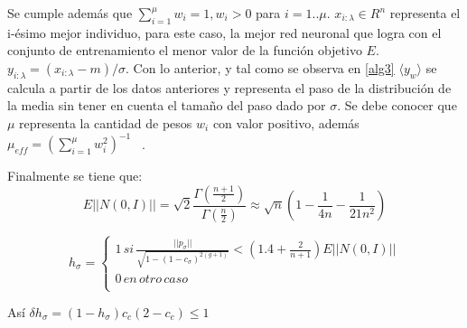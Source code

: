 Se cumple además que $\sum_{i=1}^{\mu}w_{i}=1, w_{i}>0$ para $i=1..\mu$. $x_{i:\lambda}\in R^{n}$ representa el i-ésimo mejor individuo, para este caso, la mejor red neuronal que logra con el conjunto de entrenamiento el menor valor de la función objetivo $E$. $y_{i:\lambda}= (x_{i:\lambda}-m)/\sigma$. Con lo anterior, y tal como se observa en \ref{alg3} $\langle y_{w} \rangle$ se calcula a partir de los datos anteriores y representa el paso de la distribución de la media sin tener en cuenta el tamaño del paso dado por $\sigma$. Se debe conocer que $\mu$ representa la cantidad de pesos $w_{i}$ con valor positivo, además $\mu_{eff}= (\sum_{i=1}^{\mu}w_{i}^{2})^{-1}$ ~\cite{Hansen2016}.

Finalmente se tiene que:
\[E||N(0,I)||=\sqrt{2}\frac{\Gamma(\frac{n+1}{2})}{\Gamma(\frac{n}{2})}\approx \sqrt{n}(1-\frac{1}{4n}-\frac{1}{21n^{2}})\]


\[h_{\sigma}=\begin{cases}
1\,si\,\frac{||p_{\sigma}||}{\sqrt{1-(1-c_{\sigma})^{2(g+1)}}}< (1.4 + \frac{2}{n+1})E||N(0,I)||\\
0\,en\,otro\,caso\,\\
\end{cases}
\]

Así $\delta h_{\sigma} = (1-h_{\sigma})c_{c}(2-c_{c}) \le1$
